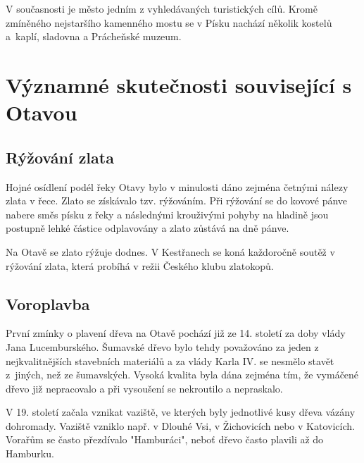 \documentclass[thesis=M,czech]{FITthesis}[2012/06/26]
\begin{document}
V současnosti je město jedním z vyhledávaných turistických cílů. Kromě zmíněného nejstaršího kamenného mostu se v Písku nachází několik kostelů a~kaplí, sladovna a Prácheňské muzeum.

\section{Významné skutečnosti související s Otavou}
\subsection{Rýžování zlata}
Hojné osídlení podél řeky Otavy bylo v minulosti dáno zejména četnými nálezy zlata v řece. Zlato se získávalo tzv. rýžováním. Při rýžování se do kovové pánve nabere směs písku z řeky a následnými krouživými pohyby na hladině jsou postupně lehké částice odplavovány a zlato zůstává na dně pánve. \cite{zlato}

Na Otavě se zlato rýžuje dodnes. V Kestřanech se koná každoročně soutěž v rýžování zlata, která probíhá v režii Českého klubu zlatokopů. 

\subsection{Voroplavba}
První zmínky o plavení dřeva na Otavě pochází již ze 14. století za doby vlády Jana Lucemburského. Šumavské dřevo bylo tehdy považováno za jeden z nejkvalitnějších stavebních materiálů a za vlády Karla IV. se nesmělo stavět z~jiných, než ze šumavských. Vysoká kvalita byla dána zejména tím, že vymáčené dřevo již nepracovalo a při vysoušení se nekroutilo a nepraskalo. 

V 19. století začala vznikat vaziště, ve kterých byly jednotlivé kusy dřeva vázány dohromady. Vaziště vzniklo např. v Dlouhé Vsi, v Žichovicích nebo v Katovicích. Vorařům se často přezdívalo "Hamburáci", neboť dřevo často plavili až do Hamburku. 
\end{document}
